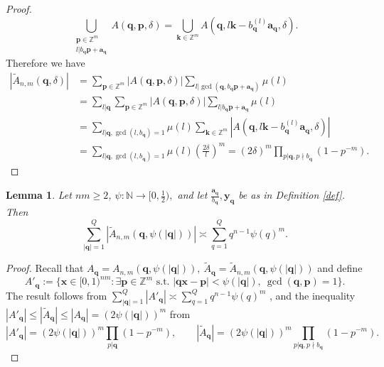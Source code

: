 \documentclass[reqno]{amsart}
\newtheorem{lemma}{Lemma}
\theoremstyle{definition}
\theoremstyle{remark}
\begin{document}
\begin{proof}
    $$\bigcup_{\substack{\mathbf{p} \in \mathbb{Z}^m \\ l|b_\mathbf{q} \mathbf{p} + \mathbf{a}_\mathbf{q}}} A(\mathbf{q}, \mathbf{p}, \delta) = \bigcup_{\mathbf{k} \in \mathbb{Z}^m} A(\mathbf{q}, l\mathbf{k} - b^{(l)}_\mathbf{q} \mathbf{a}_\mathbf{q}, \delta).$$
    Therefore we have
    \begin{align*}
        |\tilde{A}_{n,m}(\mathbf{q},\delta)| &= \sum_{\mathbf{p} \in \mathbb{Z}^m} |A(\mathbf{q}, \mathbf{p}, \delta)| \sum_{l|\gcd(\mathbf{q}, b_\mathbf{q}\mathbf{p} + \mathbf{a}_\mathbf{q})} \mu(l) \\
        &= \sum_{l|\mathbf{q}} \sum_{\mathbf{p} \in \mathbb{Z}^m} |A(\mathbf{q}, \mathbf{p}, \delta)| \sum_{l | b_\mathbf{q}\mathbf{p} + \mathbf{a}_\mathbf{q}} \mu(l) \\
        &= \sum_{l|\mathbf{q}, \gcd(l, b_\mathbf{q}) = 1}\mu(l) \sum_{\mathbf{k} \in \mathbb{Z}^m} |A(\mathbf{q}, l\mathbf{k} - b^{(l)}_\mathbf{q} \mathbf{a}_\mathbf{q}, \delta)| \\
        &= \sum_{l|\mathbf{q}, \gcd(l, b_\mathbf{q}) = 1}\mu(l) \left(\frac{2\delta}{l}\right)^m = (2\delta)^m \prod_{p|\mathbf{q}, p\nmid b_\mathbf{q}}(1-p^{-m}).
    \end{align*}
\end{proof}

\begin{lemma}\label{comparable}
    Let $nm \geq 2$, $\psi : \mathbb{N} \to [0,\frac{1}{2}),$ and let $\frac{\mathbf{a}_\mathbf{q}}{b_\mathbf{q}}, \mathbf{y}_\mathbf{q}$ be as in Definition \ref{def}. Then
    $$\sum_{|\mathbf{q}| =1}^Q \left|\tilde{A}_{n,m}(\mathbf{q}, \psi(|\mathbf{q}|))\right| \asymp \sum_{q=1}^Q q^{n-1}\psi(q)^m.$$
\end{lemma}
\begin{proof}
    Recall that $A_\mathbf{q} = A_{n,m}(\mathbf{q}, \psi(|\mathbf{q}|)),\ \tilde{A}_\mathbf{q} = \tilde{A}_{n,m}(\mathbf{q}, \psi(|\mathbf{q}|))$ and define
    $$A'_\mathbf{q} := \{\mathbf{x} \in [0,1)^{nm} : \exists \mathbf{p} \in \mathbb{Z}^m \text{ s.t. } |\mathbf{qx} - \mathbf{p}| < \psi(|\mathbf{q}|), \ \gcd(\mathbf{q},\mathbf{p}) = 1\}.$$ The result follows from $\sum_{|\mathbf{q}| =1}^Q |A'_\mathbf{q}| \asymp \sum_{q=1}^Q q^{n-1}\psi(q)^m$ \cite[Lemma 10]{BV09}, and the inequality $|A'_\mathbf{q}| \leq |\tilde{A}_\mathbf{q}| \leq |A_\mathbf{q}| = (2\psi(|\mathbf{q}|))^m$ from
    $$|A'_\mathbf{q}| = (2\psi(|\mathbf{q}|))^m \prod_{p|\mathbf{q}} (1-p^{-m}), \qquad |\tilde{A}_\mathbf{q}| = (2\psi(|\mathbf{q}|))^m\prod_{p|\mathbf{q}, p \nmid b_{\mathbf{q}}}(1-p^{-m}).$$
\end{proof}
\end{document}
